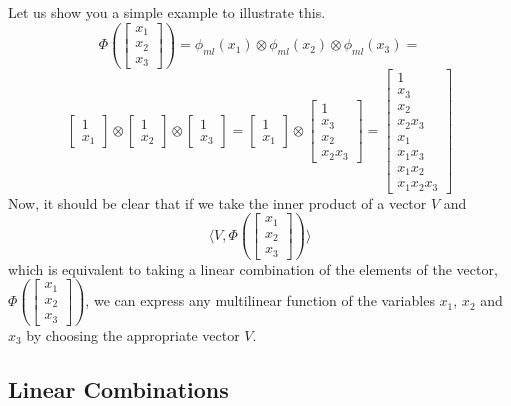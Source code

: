 \documentclass{article}
\theoremstyle{definition}
\theoremstyle{definition}
\begin{document}
Let us show you a simple example to illustrate this.
\[
    \Phi(\begin{bmatrix}x_1 \\ x_2 \\ x_3 \end{bmatrix})
    =
    \phi_{ml}(x_1) \otimes \phi_{ml}(x_2) \otimes \phi_{ml}(x_3)
    =
\]
\[
\begin{bmatrix}
    1 \\ x_1
\end{bmatrix}
\otimes
\begin{bmatrix}
    1 \\ x_2
\end{bmatrix}
\otimes
\begin{bmatrix}
    1 \\ x_3
\end{bmatrix}
=
\begin{bmatrix}
    1 \\ x_1
\end{bmatrix}
\otimes
\begin{bmatrix}
    1 \\ x_3 \\ x_2 \\ x_2 x_3
\end{bmatrix}
=
\begin{bmatrix}
    1 \\ x_3 \\ x_2 \\ x_2 x_3 \\ x_1 \\ x_1 x_3 \\ x_1 x_2 \\ x_1 x_2 x_3
\end{bmatrix}
\]
Now, it should be clear that if we take the inner product of a vector $V$ and 
\[
    \langle V,  \Phi \left(\begin{bmatrix}x_1 \\ x_2 \\ x_3 \end{bmatrix}\right) \rangle
\]
which is equivalent to taking a linear combination of the elements of the vector, 
$\Phi(\begin{bmatrix}x_1 \\ x_2 \\ x_3 \end{bmatrix})$, we can express any multilinear function of the variables $x_1$, $x_2$ and $x_3$ by choosing the appropriate vector $V$.
\subsection{Linear Combinations}
\end{document}
